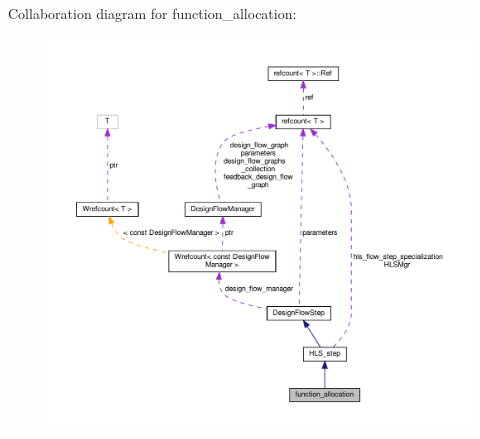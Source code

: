 Collaboration diagram for function\+\_\+allocation\+:
\nopagebreak
\begin{figure}[H]
\begin{center}
\leavevmode
\includegraphics[width=350pt]{d5/de8/classfunction__allocation__coll__graph}
\end{center}
\end{figure}
